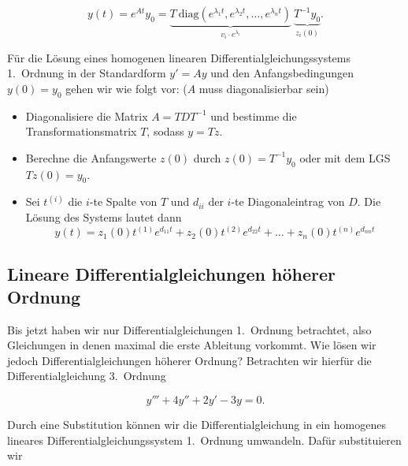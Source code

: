 \begin{equation*}
    y(t) = e^{At} y_0 = \underbrace{T \ \text{diag}(e^{\lambda_1 t}, e^{\lambda_2 t}, \ldots, e^{\lambda_n t})}_{v_i \cdot e^{\lambda_i}} \ \underbrace{T^{-1} y_0}_{z_i(0)}.
\end{equation*}

\begin{tcolorbox}[colback=gray!30, colframe=gray!80, title=Lösen von homogenen linearen Differentialgleichungssystemen]
    Für die Lösung eines homogenen linearen Differentialgleichungssystems 1.\ Ordnung in der Standardform \( y' = A y \) und den Anfangsbedingungen \( y(0) = y_0 \) gehen wir wie folgt vor: (\(A\) muss diagonalisierbar sein)
    \begin{itemize}
        \item Diagonalisiere die Matrix \( A = TDT^{-1} \) und bestimme die Transformationsmatrix \( T \), sodass  \( y =Tz \).  
        \item Berechne die Anfangswerte \(z(0)\) durch \( z(0) = T^{-1} y_0 \) oder mit dem LGS \( T z(0) = y_0  \). 
        \item Sei \( t^{(i)} \) die \( i \)-te Spalte von \( T \) und \( d_{ii} \) der \( i \)-te Diagonaleintrag von \( D \). Die Lösung des Systems lautet dann
        \begin{equation*}
            y(t) = z_1(0) t^{(1)} e^{d_{11} t} + z_2(0) t^{(2)} e^{d_{22} t} + \ldots + z_n(0) t^{(n)} e^{d_{nn} t}
        \end{equation*}
    \end{itemize}
    
\end{tcolorbox}

\subsection{Lineare Differentialgleichungen höherer Ordnung}

Bis jetzt haben wir nur Differentialgleichungen 1.\ Ordnung betrachtet, also Gleichungen in denen maximal die erste Ableitung vorkommt. Wie lösen wir jedoch Differentialgleichungen höherer Ordnung? Betrachten wir hierfür die Differentialgleichung 3.\ Ordnung

\begin{equation*}
    y''' + 4 y'' + 2y' - 3 y = 0.
\end{equation*}

Durch eine Substitution können wir die Differentialgleichung in ein homogenes lineares Differentialgleichungssystem 1.\ Ordnung umwandeln. Dafür substituieren wir

